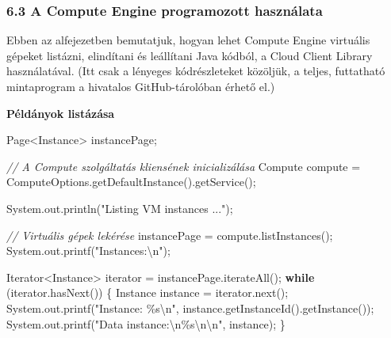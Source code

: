 \documentclass[
]{article}
\newenvironment{Shaded}{}{}
\newcommand{\BuiltInTok}[1]{\textcolor[rgb]{0.00,0.50,0.00}{#1}}
\newcommand{\CommentTok}[1]{\textcolor[rgb]{0.38,0.63,0.69}{\textit{#1}}}
\newcommand{\ControlFlowTok}[1]{\textcolor[rgb]{0.00,0.44,0.13}{\textbf{#1}}}
\newcommand{\FunctionTok}[1]{\textcolor[rgb]{0.02,0.16,0.49}{#1}}
\newcommand{\NormalTok}[1]{#1}
\newcommand{\OperatorTok}[1]{\textcolor[rgb]{0.40,0.40,0.40}{#1}}
\newcommand{\SpecialCharTok}[1]{\textcolor[rgb]{0.25,0.44,0.63}{#1}}
\newcommand{\StringTok}[1]{\textcolor[rgb]{0.25,0.44,0.63}{#1}}
\begin{document}
\hypertarget{a-compute-engine-programozott-hasznuxe1lata}{%
\subsubsection{6.3 A Compute Engine programozott
használata}\label{a-compute-engine-programozott-hasznuxe1lata}}

Ebben az alfejezetben bemutatjuk, hogyan lehet Compute Engine virtuális
gépeket listázni, elindítani és leállítani Java kódból, a Cloud Client
Library használatával. (Itt csak a lényeges kódrészleteket közöljük, a
teljes, futtatható mintaprogram a hivatalos GitHub-tárolóban érhető el.)

\textbf{Példányok listázása}

\begin{Shaded}
\begin{Highlighting}[]
\NormalTok{Page}\OperatorTok{\textless{}}\NormalTok{Instance}\OperatorTok{\textgreater{}}\NormalTok{ instancePage}\OperatorTok{;}

\CommentTok{// A Compute szolgáltatás kliensének inicializálása}
\NormalTok{Compute compute }\OperatorTok{=}\NormalTok{ ComputeOptions}\OperatorTok{.}\FunctionTok{getDefaultInstance}\OperatorTok{().}\FunctionTok{getService}\OperatorTok{();}

\BuiltInTok{System}\OperatorTok{.}\FunctionTok{out}\OperatorTok{.}\FunctionTok{println}\OperatorTok{(}\StringTok{"Listing VM instances ..."}\OperatorTok{);}

\CommentTok{// Virtuális gépek lekérése}
\NormalTok{instancePage }\OperatorTok{=}\NormalTok{ compute}\OperatorTok{.}\FunctionTok{listInstances}\OperatorTok{();}
\BuiltInTok{System}\OperatorTok{.}\FunctionTok{out}\OperatorTok{.}\FunctionTok{printf}\OperatorTok{(}\StringTok{"Instances:}\SpecialCharTok{\textbackslash{}n}\StringTok{"}\OperatorTok{);}

\BuiltInTok{Iterator}\OperatorTok{\textless{}}\NormalTok{Instance}\OperatorTok{\textgreater{}}\NormalTok{ iterator }\OperatorTok{=}\NormalTok{ instancePage}\OperatorTok{.}\FunctionTok{iterateAll}\OperatorTok{();}
\ControlFlowTok{while} \OperatorTok{(}\NormalTok{iterator}\OperatorTok{.}\FunctionTok{hasNext}\OperatorTok{())} \OperatorTok{\{}
\NormalTok{    Instance instance }\OperatorTok{=}\NormalTok{ iterator}\OperatorTok{.}\FunctionTok{next}\OperatorTok{();}
    \BuiltInTok{System}\OperatorTok{.}\FunctionTok{out}\OperatorTok{.}\FunctionTok{printf}\OperatorTok{(}\StringTok{"Instance: }\SpecialCharTok{\%s\textbackslash{}n}\StringTok{"}\OperatorTok{,}\NormalTok{ instance}\OperatorTok{.}\FunctionTok{getInstanceId}\OperatorTok{().}\FunctionTok{getInstance}\OperatorTok{());}
    \BuiltInTok{System}\OperatorTok{.}\FunctionTok{out}\OperatorTok{.}\FunctionTok{printf}\OperatorTok{(}\StringTok{"Data instance:}\SpecialCharTok{\textbackslash{}n\%s\textbackslash{}n\textbackslash{}n}\StringTok{"}\OperatorTok{,}\NormalTok{ instance}\OperatorTok{);}
\OperatorTok{\}}
\end{Highlighting}
\end{Shaded}
\end{document}
